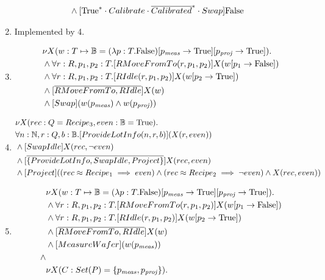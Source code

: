 \begin{enumerate}
\begin{align*}
	    &\wedge [\text{True}^{*}\cdot Calibrate\cdot \overline{Calibrated}^{*}\cdot Swap]\text{False}
    \end{align*}
    \item Implemented by 4.
    \item \begin{align*}
            &\nu X(w:T\mapsto \mathbb{B} = (\lambda p:T.\text{False})[p_\mathit{meas} \rightarrow \text{True}][p_\mathit{proj} \rightarrow \text{True}]). \\
            &\wedge \forall r:R, p_1,p_2 :T.[RMoveFromTo(r, p_1,p_2)]X(w[p_1\rightarrow \text{False}])\\
            &\wedge \forall r:R, p_1,p_2 :T.[RIdle(r, p_1,p_2)]X(w[p_2\rightarrow \text{True}])\\
            &\wedge [\overline{RMoveFromTo, RIdle}]X(w)\\
            &\wedge [Swap](w(p_\textit{meas}) \wedge w(p_\textit{proj}))
        \end{align*}
    \item \begin{align*}
    	&\nu X(rec:Q = Recipe_3, even:\mathbb{B} = \text{True}).\\
  		&\forall n:\mathbb{N}, r:Q, b:\mathbb{B}.[ProvideLotInfo(n,r,b)](X(r,even))\\
  		&\wedge [SwapIdle]X(rec, \lnot even)\\
  		&\wedge [\overline{\{ProvideLotInfo, SwapIdle, Project\}}]X(rec, even)\\
  		&\wedge [Project]((rec \approx Recipe_1 \implies even) \wedge (rec \approx Recipe_2 \implies \lnot even) \wedge X(rec, even))
    \end{align*}
    \item \begin{align*}
            &\nu X(w:T\mapsto \mathbb{B} = (\lambda p:T.\false)[p_\mathit{meas} \rightarrow \true][p_\mathit{proj} \rightarrow \true]). \\
            &\wedge \forall r:R, p_1,p_2 :T.[RMoveFromTo(r, p_1,p_2)]X(w[p_1\rightarrow \false])\\
            &\wedge \forall r:R, p_1,p_2 :T.[RIdle(r, p_1,p_2)]X(w[p_2\rightarrow \true])\\
            &\wedge [\overline{RMoveFromTo, RIdle}]X(w)\\
            &\wedge [MeasureWafer](w(p_\textit{meas}))\\
            \wedge\\
            &\nu X(C : Set(P) = \{p_\mathit{meas},p_\mathit{proj}\}).\\

\end{align*}
\end{enumerate}
